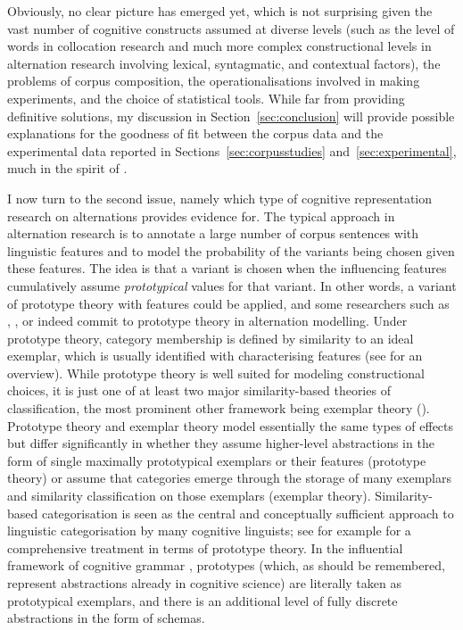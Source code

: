 Obviously, no clear picture has emerged yet, which is not surprising given the vast number of cognitive constructs assumed at diverse levels (such as the level of words in collocation research and much more complex constructional levels in alternation research involving lexical, syntagmatic, and contextual factors), the problems of corpus composition, the operationalisations involved in making experiments, and the choice of statistical tools.
While far from providing definitive solutions, my discussion in Section~\ref{sec:conclusion} will provide possible explanations for the goodness of fit between the corpus data and the experimental data reported in Sections~\ref{sec:corpusstudies} and~\ref{sec:experimental}, much in the spirit of \citet{Dabrowska2014}.

I now turn to the second issue, namely which type of cognitive representation research on alternations provides evidence for.
The typical approach in alternation research is to annotate a large number of corpus sentences with linguistic features and to model the probability of the variants being chosen given these features.
The idea is that a variant is chosen when the influencing features cumulatively assume \textit{prototypical} values for that variant.
In other words, a variant of prototype theory with features \citep{Rosch1978} could be applied, and some researchers such as \cite{Gries2003}, \cite{NessetJanda2010}, or \cite{Schaefer2016c} indeed commit to prototype theory in alternation modelling.
Under prototype theory, category membership is defined by similarity to an ideal exemplar, which is usually identified with characterising features (see \citealp{Taylor2008} for an overview).
While prototype theory is well suited for modeling constructional choices, it is just one of at least two major similarity-based theories of classification, the most prominent other framework being exemplar theory (\citealp{MedinSchaffer1978,Hintzman1986}).
Prototype theory and exemplar theory model essentially the same types of effects but differ significantly in whether they assume higher-level abstractions in the form of single maximally prototypical exemplars or their features (prototype theory) or assume that categories emerge through the storage of many exemplars and similarity classification on those exemplars (exemplar theory).
Similarity-based categorisation is seen as the central and conceptually sufficient approach to linguistic categorisation by many cognitive linguists; see for example \cite{Taylor2003} for a comprehensive treatment in terms of prototype theory.
In the influential framework of cognitive grammar \citep{Langacker1987}, prototypes (which, as should be remembered, represent abstractions already in cognitive science) are literally taken as prototypical exemplars, and there is an additional level of fully discrete abstractions in the form of schemas.

